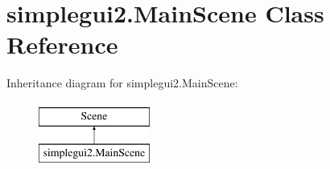 \hypertarget{classsimplegui2_1_1_main_scene}{\section{simplegui2.\-Main\-Scene Class Reference}
\label{classsimplegui2_1_1_main_scene}
}
Inheritance diagram for simplegui2.\-Main\-Scene\-:\begin{figure}[H]
\begin{center}
\leavevmode
\includegraphics[height=2.000000cm]{classsimplegui2_1_1_main_scene}
\end{center}
\end{figure}
